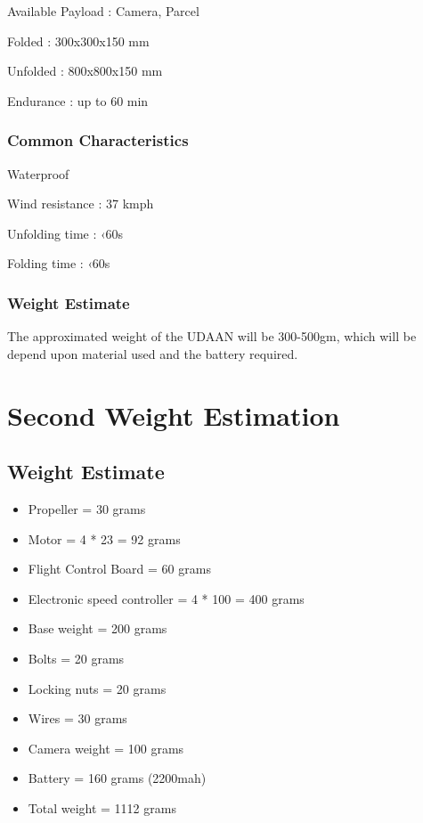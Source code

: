 \documentclass[8pt]{report}
\begin{document}
Available Payload : Camera, Parcel

Folded : 300x300x150 mm

Unfolded : 800x800x150 mm

Endurance : up to 60 min

\subsection{Common Characteristics}

Waterproof

Wind resistance : 37 kmph

Unfolding time : ‹60s

Folding time : ‹60s

\subsection{Weight Estimate}
The approximated weight of the UDAAN will be 300-500gm, which will be depend upon material used and the battery required.



\chapter{Second Weight Estimation}

\section{Weight Estimate}
\begin{itemize}
\item Propeller = 30 grams

\item Motor = 4 * 23 = 92 grams

\item Flight Control Board = 60 grams

\item Electronic speed controller = 4 * 100 = 400 grams

\item Base weight = 200 grams

\item Bolts = 20 grams

\item Locking nuts = 20 grams

\item Wires = 30 grams

\item Camera weight = 100 grams

\item Battery = 160 grams (2200mah)



\item Total weight = 1112 grams

\end{itemize}
\end{document}
